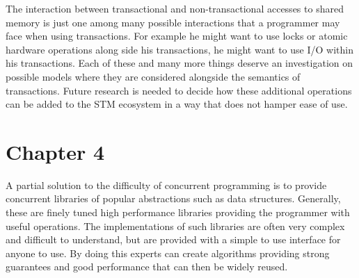 The interaction between transactional and non-transactional accesses to shared memory
is just one among many possible interactions that a programmer may face when using
transactions.
For example he might want to use locks or atomic hardware operations along side his transactions,
he might want to use I/O within his transactions.
Each of these and many more things deserve an investigation on possible models where
they are considered alongside the semantics of transactions.
Future research is needed to decide how these additional operations can be added
to the STM ecosystem in a way that does not hamper ease of use.








\section{Chapter 4}
A partial solution to the difficulty of concurrent programming
is to provide concurrent libraries of popular abstractions such as data structures.
Generally, these are finely tuned high performance libraries
providing the programmer with useful operations.
The implementations of such libraries are often very complex
and difficult to understand, but are provided with a simple to use
interface for anyone to use.
By doing this experts can create algorithms providing strong guarantees
and good performance that can then be widely reused.

% 
% 

